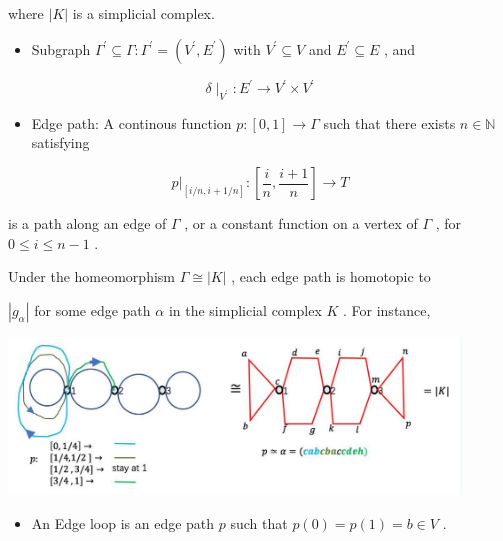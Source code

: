 where \(\left| K\right|\) is a simplicial complex.

\begin{itemize}
\item Subgraph \({\Gamma }^{\prime } \subseteq  \Gamma  : {\Gamma }^{\prime } = \left( {{V}^{\prime },{E}^{\prime }}\right)\) with \({V}^{\prime } \subseteq  V\) and \({E}^{\prime } \subseteq  E\) , and
\end{itemize}

\[
\delta { \mid  }_{{V}^{\prime }} : {E}^{\prime } \rightarrow  {V}^{\prime } \times  {V}^{\prime }
\]

\begin{itemize}
\item Edge path: A continous function \(p : \left\lbrack  {0,1}\right\rbrack   \rightarrow  \Gamma\) such that there exists \(n \in  \mathbb{N}\) satisfying
\end{itemize}

\[
{\left. p\right| }_{\left\lbrack  i/n,i + 1/n\right\rbrack  } : \left\lbrack  {\frac{i}{n},\frac{i + 1}{n}}\right\rbrack   \rightarrow  T
\]

is a path along an edge of \(\Gamma\) , or a constant function on a vertex of \(\Gamma\) , for \(0 \leq  i \leq  n - 1\) .

Under the homeomorphism \(\Gamma  \cong  \left| K\right|\) , each edge path is homotopic to

\(\left| {g}_{\alpha }\right|\) for some edge path \(\alpha\) in the simplicial complex \(K\) . For instance,

\begin{center}
\includegraphics[max width=0.9\textwidth]{images/bo_d2bcsrref24c73avs720_145_296_329_1095_382_0.jpg}
\end{center}
\hspace*{3em} 

\begin{itemize}
\item An Edge loop is an edge path \(p\) such that \(p\left( 0\right)  = p\left( 1\right)  = b \in  V\) .
\end{itemize}

